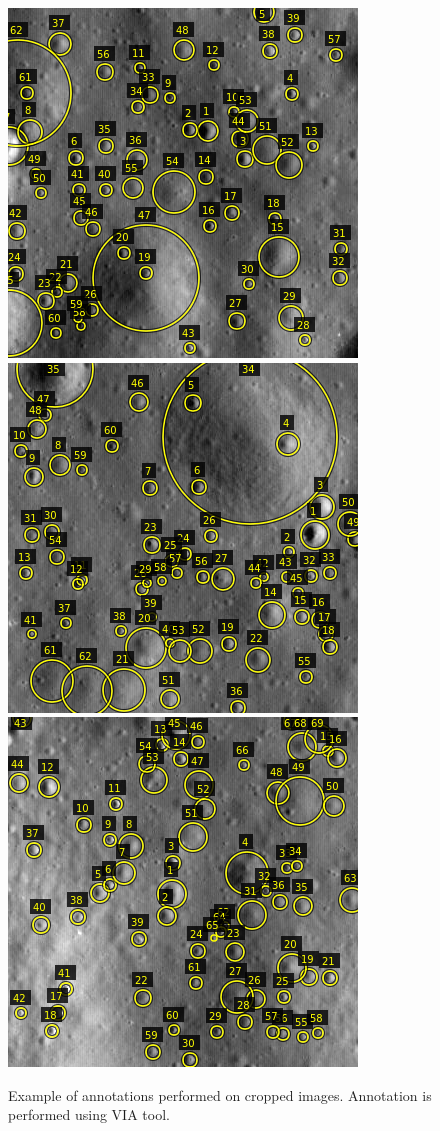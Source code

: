 \documentclass[11pt]{article}
\begin{document}
\begin{figure}[ht!]
	\includegraphics[width=.3\textwidth]{files/annotation/66n.png}\hfill
	\includegraphics[width=.3\textwidth]{files/annotation/29n.png}\hfill
	\includegraphics[width=.3\textwidth]{files/annotation/20n.png}
	\caption{Example of annotations performed on cropped images. Annotation is performed using VIA tool.}
	\label{an}
\end{figure}
\end{document}
